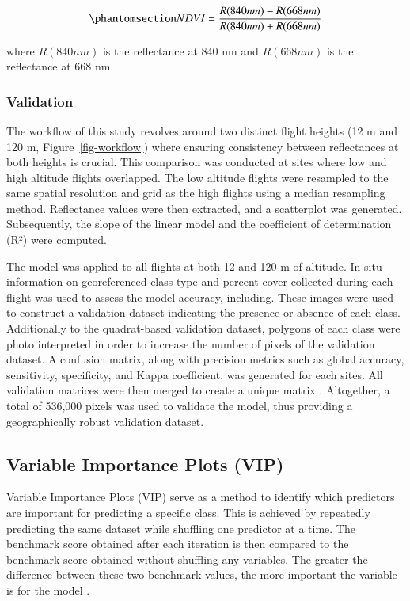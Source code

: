 \documentclass[
  number]{elsarticle}
\begin{document}
\begin{equation}\phantomsection\label{eq-ndvi}{
NDVI = \frac{R(840nm)-R(668nm)}{R(840nm)+R(668nm)}
}\end{equation}

where \(R(840nm)\) is the reflectance at 840 nm and \(R(668nm)\) is the
reflectance at 668 nm.

\subsubsection{Validation}\label{validation}

The workflow of this study revolves around two distinct flight heights
(12 m and 120 m, Figure~\ref{fig-workflow}) where ensuring consistency
between reflectances at both heights is crucial. This comparison was
conducted at sites where low and high altitude flights overlapped. The
low altitude flights were resampled to the same spatial resolution and
grid as the high flights using a median resampling method. Reflectance
values were then extracted, and a scatterplot was generated.
Subsequently, the slope of the linear model and the coefficient of
determination (R²) were computed.

The model was applied to all flights at both 12 and 120 m of altitude.
In situ information on georeferenced class type and percent cover
collected during each flight was used to assess the model accuracy,
including. These images were used to construct a validation dataset
indicating the presence or absence of each class. Additionally to the
quadrat-based validation dataset, polygons of each class were photo
interpreted in order to increase the number of pixels of the validation
dataset. A confusion matrix, along with precision metrics such as global
accuracy, sensitivity, specificity, and Kappa coefficient, was generated
for each sites. All validation matrices were then merged to create a
unique matrix . Altogether, a total of 536,000 pixels was used to
validate the model, thus providing a geographically robust validation
dataset.

\subsection{Variable Importance Plots
(VIP)}\label{variable-importance-plots-vip}

Variable Importance Plots (VIP) serve as a method to identify which
predictors are important for predicting a specific class. This is
achieved by repeatedly predicting the same dataset while shuffling one
predictor at a time. The benchmark score obtained after each iteration
is then compared to the benchmark score obtained without shuffling any
variables. The greater the difference between these two benchmark
values, the more important the variable is for the model
\citep{WEI2015399}.
\end{document}
